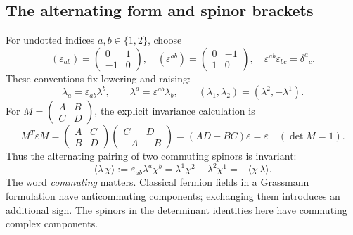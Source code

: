 \subsection{The alternating form and spinor brackets}
For undotted indices $a,b\in\{1,2\}$, choose
\begin{equation}\label{qft:spinor-epsilon}
 (\varepsilon_{ab})=\begin{pmatrix}0&1\\-1&0\end{pmatrix},\quad
 (\varepsilon^{ab})=\begin{pmatrix}0&-1\\1&0\end{pmatrix},\quad
 \varepsilon^{ab}\varepsilon_{bc}=\delta^a{}_c.
\end{equation}
These conventions fix lowering and raising:
\begin{equation}\label{qft:spinor-raising}
 \lambda_a=\varepsilon_{ab}\lambda^b,
 \qquad \lambda^a=\varepsilon^{ab}\lambda_b,
 \qquad (\lambda_1,\lambda_2)=(\lambda^2,-\lambda^1).
\end{equation}
For $M=\begin{pmatrix}A&B\\C&D\end{pmatrix}$, the explicit invariance
calculation is
\begin{equation}\label{qft:epsilon-invariance}
 M^T\varepsilon M
 =\begin{pmatrix}A&C\\B&D\end{pmatrix}
  \begin{pmatrix}C&D\\-A&-B\end{pmatrix}
 =(AD-BC)\varepsilon=\varepsilon
 \quad (\det M=1).
\end{equation}
Thus the alternating pairing of two commuting spinors is invariant:
\begin{equation}\label{qft:angle-bracket}
 \langle\lambda\,\chi\rangle
 :=\varepsilon_{ab}\lambda^a\chi^b
 =\lambda^1\chi^2-\lambda^2\chi^1
 =-\langle\chi\,\lambda\rangle.
\end{equation}
The word \emph{commuting} matters. Classical fermion fields in a
Grassmann formulation have anticommuting components; exchanging them
introduces an additional sign. The spinors in the determinant identities
here have commuting complex components.

